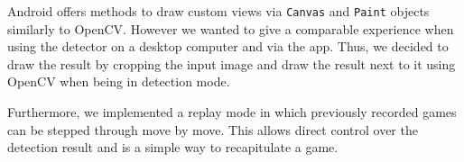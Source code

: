 	Android offers methods to draw custom views via \texttt{Canvas} and \texttt{Paint} objects similarly to OpenCV. However we wanted to give a comparable experience when using the detector on a desktop computer and via the app. Thus, we decided to draw the result by cropping the input image and draw the result next to it using OpenCV when being in detection mode.

	Furthermore, we implemented a replay mode in which previously recorded games can be stepped through move by move. This allows direct control over the detection result and is a simple way to recapitulate a game.
